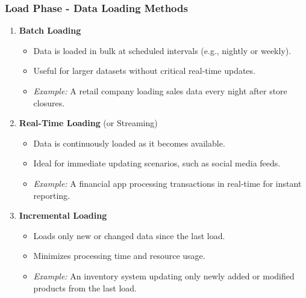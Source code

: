 \documentclass[aspectratio=169]{beamer}
\begin{document}
\begin{frame}[fragile]
    \frametitle{Load Phase - Data Loading Methods}
    \begin{enumerate}
        \item \textbf{Batch Loading}
        \begin{itemize}
            \item Data is loaded in bulk at scheduled intervals (e.g., nightly or weekly).
            \item Useful for larger datasets without critical real-time updates.
            \item \textit{Example:} A retail company loading sales data every night after store closures.
        \end{itemize}
        
        \item \textbf{Real-Time Loading} (or Streaming)
        \begin{itemize}
            \item Data is continuously loaded as it becomes available.
            \item Ideal for immediate updating scenarios, such as social media feeds.
            \item \textit{Example:} A financial app processing transactions in real-time for instant reporting.
        \end{itemize}
        
        \item \textbf{Incremental Loading}
        \begin{itemize}
            \item Loads only new or changed data since the last load.
            \item Minimizes processing time and resource usage.
            \item \textit{Example:} An inventory system updating only newly added or modified products from the last load.
        \end{itemize}
    \end{enumerate}
\end{frame}
\end{document}
